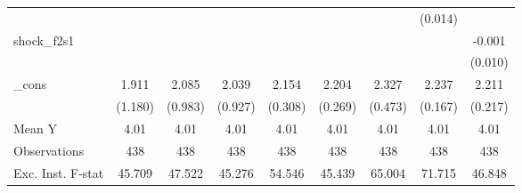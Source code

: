 {\begin{tabular}{l*{8}{c}}
            &                     &                     &                     &                     &                     &                     &     (0.014)         &                     \\
\addlinespace
shock\_f2s1  &                     &                     &                     &                     &                     &                     &                     &      -0.001         \\
            &                     &                     &                     &                     &                     &                     &                     &     (0.010)         \\
\addlinespace
\_cons      &       1.911         &       2.085\sym{**} &       2.039\sym{**} &       2.154\sym{***}&       2.204\sym{***}&       2.327\sym{***}&       2.237\sym{***}&       2.211\sym{***}\\
            &     (1.180)         &     (0.983)         &     (0.927)         &     (0.308)         &     (0.269)         &     (0.473)         &     (0.167)         &     (0.217)         \\
\midrule
Mean Y      &        4.01         &        4.01         &        4.01         &        4.01         &        4.01         &        4.01         &        4.01         &        4.01         \\
Observations&         438         &         438         &         438         &         438         &         438         &         438         &         438         &         438         \\
Exc. Inst. F-stat&      45.709         &      47.522         &      45.276         &      54.546         &      45.439         &      65.004         &      71.715         &      46.848         \\
\bottomrule
\end{tabular}
}
